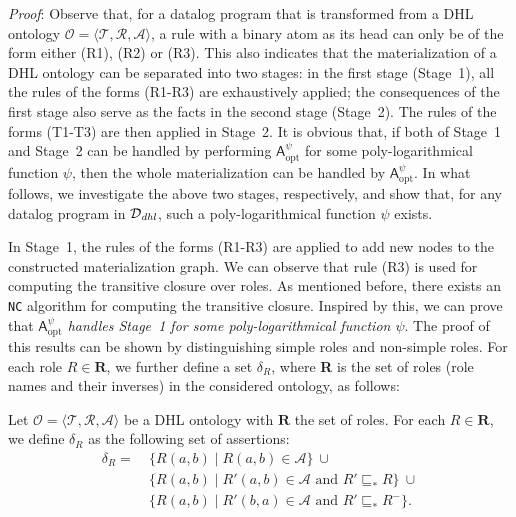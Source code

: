 \noindent\emph{Proof}: Observe that, for a datalog program that is
transformed from a DHL ontology $\mathcal{O}=\langle\mathcal{T},\mathcal{R},\mathcal{A}\rangle$,
a rule with a binary atom as its head can only be of the form either (R1), (R2) or (R3).
This also indicates that the materialization of a DHL
ontology can be separated into two stages: in the first stage (Stage~1), all the rules
of the forms (R1-R3) are exhaustively applied; the consequences of the first stage
also serve as the facts in the second stage (Stage~2). The rules of the forms (T1-T3)
are then applied in Stage~2.
It is obvious that, if both of Stage~1 and Stage~2 can be handled
by performing $\mathsf{A}_{\text{opt}}^\psi$ for some poly-logarithmical function $\psi$, then
the whole materialization can be handled by $\mathsf{A}_{\text{opt}}^\psi$.
In what follows, we investigate the above two stages, respectively, and show that,
for any datalog program in $\mathcal{D}_{\textit{\text{dhl}}}$,
such a poly-logarithmical function $\psi$ exists.

In Stage~1, the rules of the forms (R1-R3)
are applied to add new nodes to the constructed materialization graph.
We can observe that rule (R3) is used for computing the transitive
closure over roles.
As mentioned before, there exists an \texttt{NC} algorithm for
computing the transitive closure.
Inspired by this, we can prove that \emph{$\mathsf{A}_{\text{opt}}^\psi$
handles Stage~1 for some poly-logarithmical function $\psi$}.
The proof of this results can be shown by distinguishing simple roles
and non-simple roles.
%
For each role $R\in\textbf{R}$, we further define a set $\delta_R$,
where \textbf{R} is the set of roles (role names and their inverses)
in the considered ontology, as follows:

\begin{definition}\label{def:deltaRdhl}
Let $\mathcal{O}=\langle\mathcal{T},\mathcal{R},\mathcal{A}\rangle$ be
a DHL ontology with $\textbf{R}$ the set of roles. For each
$R\in\textbf{R}$, we define $\delta_R$ as the following set of assertions:
\begin{align*}
\delta_R =\ & \{ R(a,b) \mid R(a,b) \in\mathcal{A} \}\ \cup\\
& \{ R(a,b) \mid R'(a,b)\in\mathcal{A} \text{ and } R' \sqsubseteq_{*}
  R \}\ \cup\\
& \{ R(a,b) \mid R'(b,a)\in\mathcal{A} \text{ and } R'\sqsubseteq_{*}
  R^- \}.
\end{align*}
\end{definition}

